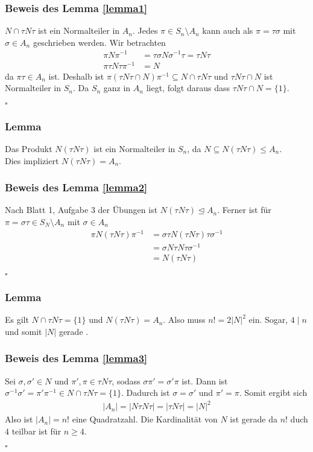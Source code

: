 \documentclass[12pt, german]{article}
\newcommand{\bewiesen}{

\begin{flushright}
		$\square$  \\
\end{flushright}}
\begin{document}
\subsubsection{Beweis des Lemma \ref{lemma1}}
		$N \cap \tau N \tau$ ist ein Normalteiler in $A_n$. Jedes $\pi \in S_n \setminus A_n$ kann auch als $\pi = \tau\sigma$ mit $\sigma \in A_n$ geschrieben werden.
		Wir betrachten 
		\begin{align*}
			\pi N \pi^{-1} &= \tau \sigma N \sigma^{-1} \tau = \tau N \tau  \\ 
			\pi \tau N \tau \pi^{-1} &= N
		\end{align*} 
		da $\pi\tau \in A_n$ ist. 
		Deshalb ist $\pi(\tau N \tau \cap N) \pi^{-1} \subseteq N \cap \tau N \tau$ und $\tau N \tau \cap N$ ist Normalteiler in $S_n$. Da $S_n$ ganz in $A_n$ liegt, folgt daraus dass $\tau N \tau \cap N = \{1\}$. 
		\bewiesen

\subsubsection{Lemma \label{lemma2}}
		Das Produkt $N(\tau N \tau)$ ist ein Normalteiler in $S_n$, da $N \subseteq N(\tau N \tau) \leq A_n$. \\ 
		Dies impliziert $N(\tau N \tau) = A_n$.
\subsubsection{Beweis des Lemma \ref{lemma2}}
		Nach Blatt 1, Aufgabe 3 der Übungen ist $N(\tau N \tau) \trianglelefteq A_n$. Ferner ist für $\pi = \sigma\tau \in S_N \setminus A_n$ mit $\sigma \in A_n$ 
		\begin{align*}
			\pi N(\tau N\tau) \pi^{-1} &= \sigma \tau N (\tau N \tau) \tau \sigma^{-1}  \\ 
			&= \sigma N \tau N \tau \sigma^{-1} \\
			&= N(\tau N \tau)
		\end{align*}
	\bewiesen

\subsubsection{Lemma \label{lemma3}}
	Es gilt $N\cap \tau N \tau =  \{1\}$ und $N(  \tau N \tau ) = A_n$. Also muss $n! = 2 |N|^2$ ein. Sogar, $4 \mid n$ und somit $|N|$ gerade . 
\subsubsection{Beweis des Lemma \ref{lemma3}}
Sei $\sigma, \sigma' \in N$ und $\pi', \pi \in \tau N \tau$, sodass $\sigma\pi' = \sigma'\pi$ ist. Dann ist $\sigma^{-1}\sigma' = \pi'\pi^{-1} \in N \cap \tau N \tau = \{1\}$. Dadurch ist $\sigma = \sigma'$ und $\pi' = \pi$. Somit ergibt sich 
\begin{align*}
	|A_n| = |N\tau N\tau| = |\tau N \tau| = |N|^2
\end{align*}
Also ist $|A_n| = n!$ eine Quadratzahl. Die Kardinalität von $N$ ist gerade da $n!$ duch $4$ teilbar ist für $n \geq 4$. 
\bewiesen
\end{document}
